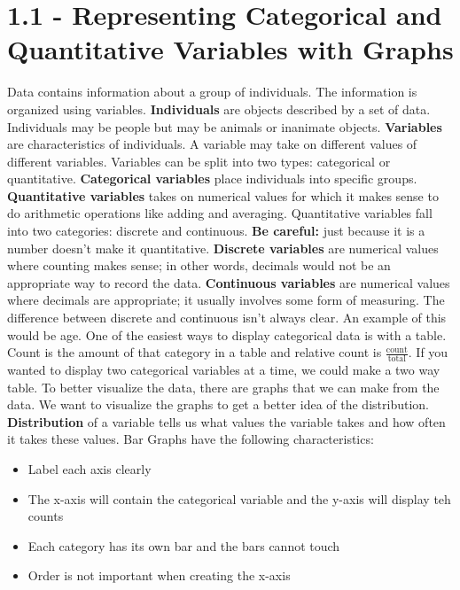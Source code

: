 \documentclass[../stats.tex]{subfiles}
\begin{document}
\section*{1.1 - Representing Categorical and Quantitative Variables with Graphs}
Data contains information about a group of individuals. The information is organized using variables.
\smallbreak
\textbf{Individuals} are objects described by a set of data. Individuals may be people but may be animals or inanimate objects.
\smallbreak
\textbf{Variables} are characteristics of individuals. A variable may take on different values of different variables. Variables can be split into two types: categorical or quantitative.
\smallbreak
\textbf{Categorical variables} place individuals into specific groups.
\smallbreak
\textbf{Quantitative variables} takes on numerical values for which it makes sense to do arithmetic operations like adding and averaging. Quantitative variables fall into two categories: discrete and continuous.
\smallbreak
\textbf{Be careful: } just because it is a number doesn't make it quantitative.
\smallbreak
\textbf{Discrete variables} are numerical values where counting makes sense; in other words, decimals would not be an appropriate way to record the data.
\smallbreak
\textbf{Continuous variables} are numerical values where decimals are appropriate; it usually involves some form of measuring.
\smallbreak
The difference between discrete and continuous isn't always clear. An example of this would be age.
\medbreak
One of the easiest ways to display categorical data is with a table.
\smallbreak
Count is the amount of that category in a table and relative count is $\frac{\text{count}}{\text{total}}$.
\smallbreak
If you wanted to display two categorical variables at a time, we could make a two way table.
\smallbreak
To better visualize the data, there are graphs that we can make from the data. We want to visualize the graphs to get a better idea of the distribution.
\smallbreak
\textbf{Distribution} of a variable tells us what values the variable takes and how often it takes these values.
\smallbreak
Bar Graphs have the following characteristics:
\begin{itemize}
    \item Label each axis clearly
    \item The x-axis will contain the categorical variable and the y-axis will display teh counts
    \item Each category has its own bar and the bars cannot touch
    \item Order is not important when creating the x-axis
\end{itemize}
\end{document}
